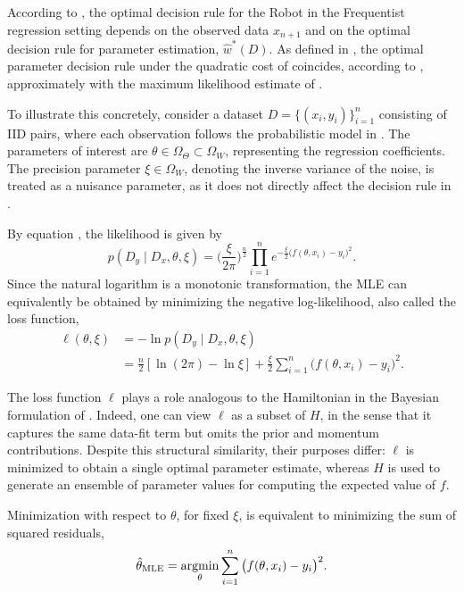 \begin{remark}
	\label{rm:frequentist_regression}
	According to , the optimal decision rule for the Robot in the Frequentist regression setting depends on the observed data $x_{n+1}$ and on the optimal decision rule for parameter estimation, $\hat{w}^*(D)$. As defined in , the optimal parameter decision rule under the quadratic cost of  coincides, according to , approximately with the maximum likelihood estimate of .
	
	To illustrate this concretely, consider a dataset $D = \{(x_i, y_i)\}_{i=1}^n$ consisting of IID pairs, where each observation follows the probabilistic model in . The parameters of interest are $\theta \in \Omega_\Theta \subset \Omega_W$, representing the regression coefficients. The precision parameter $\xi \in \Omega_W$, denoting the inverse variance of the noise, is treated as a nuisance parameter, as it does not directly affect the decision rule in .
	
	By equation , the likelihood is given by
	\begin{equation}
		p(D_y \mid D_x, \theta, \xi) 
		= \bigg(\frac{\xi}{2\pi}\bigg)^{\!\frac{n}{2}}
		\prod_{i=1}^n e^{-\frac{\xi}{2}\big(f(\theta, x_i) - y_i\big)^2}.
		\label{eq:freq_reg_likelihood}
	\end{equation}
	Since the natural logarithm is a monotonic transformation, the MLE can equivalently be obtained by minimizing the negative log-likelihood, also called the loss function,
	\begin{equation}
		\begin{split}
			\ell(\theta, \xi)
			&= -\ln p(D_y \mid D_x, \theta, \xi) \\
			&= \frac{n}{2}[\ln(2\pi) -\ln\xi]
			+ \frac{\xi}{2}\sum_{i=1}^n \big(f(\theta, x_i) - y_i\big)^2.
		\end{split}
	\end{equation}
	
	The loss function $\ell$ plays a role analogous to the Hamiltonian in the Bayesian formulation of . Indeed, one can view $\ell$ as a subset of $H$, in the sense that it captures the same data-fit term but omits the prior and momentum contributions. Despite this structural similarity, their purposes differ: $\ell$ is minimized to obtain a single optimal parameter estimate, whereas $H$ is used to generate an ensemble of parameter values for computing the expected value of $f$.
	
	Minimization with respect to $\theta$, for fixed $\xi$, is equivalent to minimizing the sum of squared residuals,
	\begin{equation}
		\hat{\theta}_{\text{MLE}}
		= \operatorname*{argmin}_{\theta}
		\sum_{i=1}^n \big(f(\theta, x_i) - y_i\big)^2.
	\end{equation}
\end{remark}

